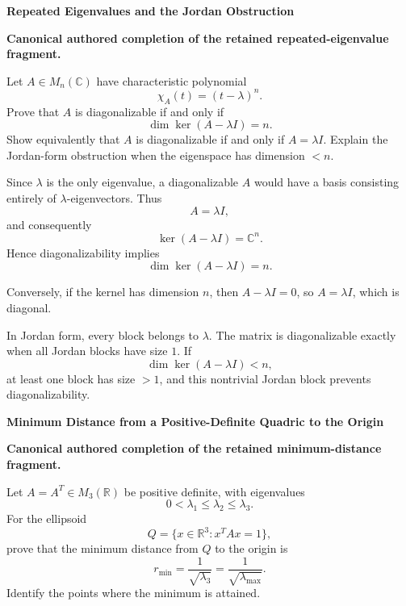 \begin{problem}[CP-I-0023]
\label{prob:cp-i-0023}
\textbf{Repeated Eigenvalues and the Jordan Obstruction}

\textbf{Canonical authored completion of the retained repeated-eigenvalue fragment.}

\hspace*{1.5em}Let \(A\in M_n(\mathbb C)\) have characteristic polynomial
\[
\chi_A(t)=(t-\lambda)^n.
\]
Prove that \(A\) is diagonalizable if and only if
\[
\dim\ker(A-\lambda I)=n.
\]
Show equivalently that \(A\) is diagonalizable if and only if \(A=\lambda I\). Explain the
Jordan-form obstruction when the eigenspace has dimension \(<n\).
\end{problem}

\begin{solution}
Since \(\lambda\) is the only eigenvalue, a diagonalizable \(A\) would have a basis consisting
entirely of \(\lambda\)-eigenvectors. Thus
\[
A=\lambda I,
\]
and consequently
\[
\ker(A-\lambda I)=\mathbb C^n.
\]
Hence diagonalizability implies
\[
\dim\ker(A-\lambda I)=n.
\]

Conversely, if the kernel has dimension \(n\), then \(A-\lambda I=0\), so \(A=\lambda I\),
which is diagonal.

In Jordan form, every block belongs to \(\lambda\). The matrix is diagonalizable exactly when
all Jordan blocks have size \(1\). If
\[
\dim\ker(A-\lambda I)<n,
\]
at least one block has size \(>1\), and this nontrivial Jordan block prevents diagonalizability.
\end{solution}

\begin{problem}[CP-I-0024]
\label{prob:cp-i-0024}
\textbf{Minimum Distance from a Positive-Definite Quadric to the Origin}

\textbf{Canonical authored completion of the retained minimum-distance fragment.}

\hspace*{1.5em}Let \(A=A^T\in M_3(\mathbb R)\) be positive definite, with eigenvalues
\[
0<\lambda_1\le \lambda_2\le \lambda_3.
\]
For the ellipsoid
\[
Q=\{x\in\mathbb R^3:x^TAx=1\},
\]
prove that the minimum distance from \(Q\) to the origin is
\[
r_{\min}=\frac1{\sqrt{\lambda_3}}
=\frac1{\sqrt{\lambda_{\max}}}.
\]
Identify the points where the minimum is attained.
\end{problem}

